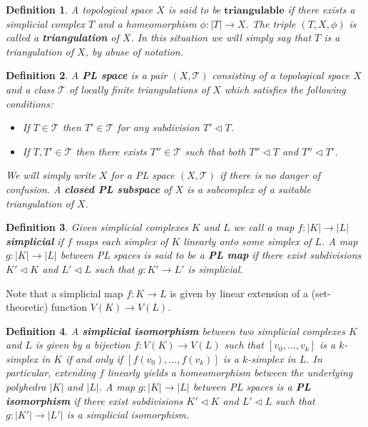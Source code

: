 \documentclass[11pt]{book}
\newtheorem{definition}{Definition}
\begin{document}
\begin{definition}
A topological space $X$ is said to be $\mathbf{triangulable}$ if there exists a simplicial complex $T$ and a homeomorphism $\phi : |T| \to X$. The triple $(T,X, \phi)$ is called a \textbf{triangulation} of $X$. In this situation we will simply say that $T$ is a triangulation of $X$, by abuse of notation.
\end{definition}


\begin{definition}
A \textbf{PL space} is a pair $(X,\mathcal{T})$ consisting of a topological space $X$ and a class $\mathcal{T}$ of locally finite triangulations of $X$ which satisfies the following conditions:
\begin{itemize}
\item If $T \in \mathcal{T}$ then $T' \in \mathcal{T}$ for any subdivision $T' \lhd T$.
\item If $T,T' \in \mathcal{T}$ then there exists $T'' \in \mathcal{T}$ such that both $T'' \lhd T$ and $T'' \lhd T'$.
\end{itemize}
We will simply write $X$ for a PL space $(X,\mathcal{T})$ if there is no danger of confusion. A \textbf{closed PL subspace} of $X$ is a subcomplex of a suitable triangulation of $X$.
\end{definition}

\begin{definition}
Given simplicial complexes $K$ and $L$ we call a map $f: |K| \to |L|$ \textbf{simplicial} if $f$ maps each simplex of $K$ linearly onto some simplex of $L$. A map $g: |K| \to |L|$ between PL spaces  is said to be a \textbf{PL map} if there exist subdivisions $K' \lhd K$ and $L' \lhd L$ such that $g: K' \to L' $ is simplicial.
\end{definition}
Note that a simplicial map $f: K \to L$ is given by linear extension of a (set-theoretic) function $V(K) \to V(L)$.

\begin{definition}
A \textbf{simplicial isomorphism} between two simplicial complexes $K$ and $L$ is given by a bijection $f : V(K) \to V(L)$ such that $[v_0,...,v_k]$ is a $k$-simplex in $K$ if and only if $[f(v_0),...,f(v_k)]$ is a $k$-simplex in $L$. In particular, extending $f$ linearly yields a homeomorphism between the underlying polyhedra $|K|$ and $|L|$. A map $g: |K| \to |L|$ between PL spaces is a \textbf{PL isomorphism} if there exist subdivisions $K' \lhd K$ and $L' \lhd L$ such that $g: |K'| \to |L'|$ is a simplicial isomorphism.
\end{definition}
\end{document}
